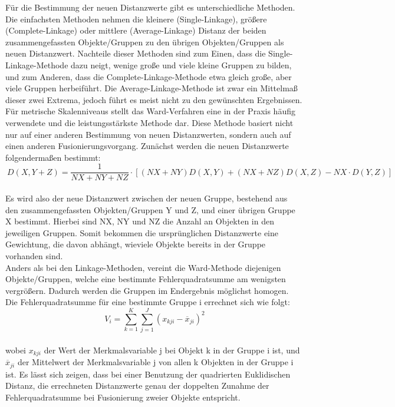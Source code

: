 \documentclass[12pt,titlepage]{article}
\begin{document}
Für die Bestimmung der neuen Distanzwerte gibt es unterschiedliche Methoden. Die einfachsten Methoden nehmen die kleinere (Single-Linkage), größere (Complete-Linkage) oder mittlere (Average-Linkage) Distanz der beiden zusammengefassten Objekte/Gruppen zu den übrigen Objekten/Gruppen als neuen Distanzwert. Nachteile dieser Methoden sind zum Einen, dass die Single-Linkage-Methode dazu neigt, wenige große und viele kleine Gruppen zu bilden, und zum Anderen, dass die Complete-Linkage-Methode etwa gleich große, aber viele Gruppen herbeiführt. Die Average-Linkage-Methode ist zwar ein Mittelmaß dieser zwei Extrema, jedoch führt es meist nicht zu den gewünschten Ergebnissen. \\
Für metrische Skalenniveaus stellt das Ward-Verfahren eine in der Praxis häufig verwendete und die leistungsstärkste \cite[S. 96 f.]{Bergs1981} Methode dar. Diese Methode basiert nicht nur auf einer anderen Bestimmung von neuen Distanzwerten, sondern auch auf einen anderen Fusionierungsvorgang. Zunächst werden die neuen Distanzwerte folgendermaßen bestimmt:
\begin{equation}
 \ D(X,Y+Z)=\frac{1}{NX+NY+NZ}\cdot [(NX+NY)D(X,Y)+(NX+NZ)D(X,Z)-NX\cdot D(Y,Z)]
\end{equation} \\
Es wird also der neue Distanzwert zwischen der neuen Gruppe, bestehend aus den zusammengefassten Objekten/Gruppen Y und Z, und einer übrigen Gruppe X bestimmt. Hierbei sind NX, NY und NZ die Anzahl an Objekten in den jeweiligen Gruppen. Somit bekommen die ursprünglichen Distanzwerte eine Gewichtung, die davon abhängt, wieviele Objekte bereits in der Gruppe vorhanden sind. \\
Anders als bei den Linkage-Methoden, vereint die Ward-Methode diejenigen Objekte/Gruppen, welche eine bestimmte Fehlerquadratsumme am wenigsten vergrößern. Dadurch werden die Gruppen im Endergebnis möglichst homogen. Die Fehlerquadratsumme für eine bestimmte Gruppe i errechnet sich wie folgt:
\begin{equation}
 \ V_{i}=\sum_{k=1}^{K}\sum_{j=1}^{J} (x_{kji} -\overline{x}_{ji})^2
\end{equation} \\
wobei $x_{kji}$ der Wert der Merkmalsvariable j bei Objekt k in der Gruppe i ist, und $\overline{x}_{ji}$ der Mittelwert der Merkmalsvariable j von allen k Objekten in der Gruppe i ist. Es lässt sich zeigen, dass bei einer Benutzung der quadrierten Euklidischen Distanz, die errechneten Distanzwerte genau der doppelten Zunahme der Fehlerquadratsumme bei Fusionierung zweier Objekte entspricht. \\ 
\end{document}
